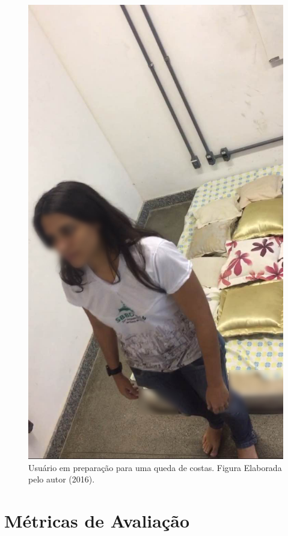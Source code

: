 \begin{figure}[ht]
	\centering
	\includegraphics[scale=0.25]{imagens/fall_image.png}
	\caption{Usuário em preparação para uma queda de costas. Figura Elaborada pelo autor (2016).}
	\label{fig:fall_image}
\end{figure} 


\section{Métricas de Avaliação}
\label{sec:metrics}

